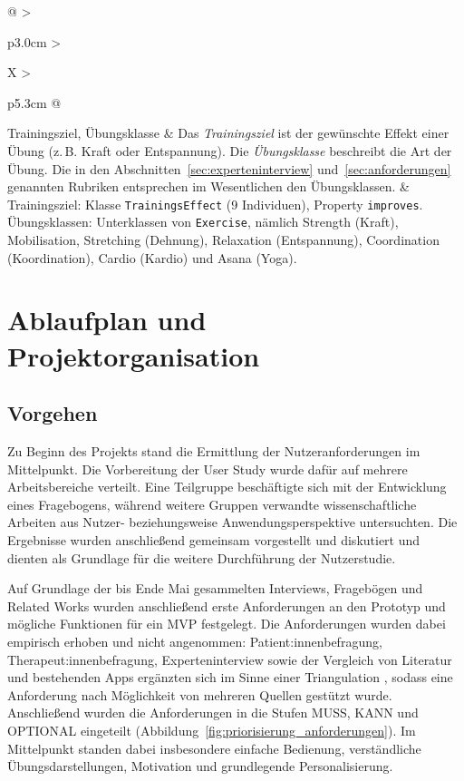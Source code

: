 {\begin{xltabular}{\textwidth}{@{} >{\raggedright\arraybackslash}p{3.0cm} >{\raggedright\arraybackslash}X >{\raggedright\arraybackslash}p{5.3cm} @{}}
    Trainingsziel, Übungsklasse & Das \emph{Trainingsziel} ist der gewünschte Effekt einer Übung (z.\,B. Kraft oder Entspannung). Die \emph{Übungsklasse} beschreibt die Art der Übung. Die in den Abschnitten~\ref{sec:experteninterview} und~\ref{sec:anforderungen} genannten Rubriken entsprechen im Wesentlichen den Übungsklassen. & Trainingsziel: Klasse \texttt{TrainingsEffect} (9 Individuen), Property \texttt{improves}. Übungsklassen: Unterklassen von \texttt{Exercise}, nämlich Strength (Kraft), Mobilisation, Stretching (Dehnung), Relaxation (Entspannung), Coordination (Koordination), Cardio (Kardio) und Asana (Yoga). \\
\end{xltabular}
}

\section{Ablaufplan und Projektorganisation}

\subsection{Vorgehen}

Zu Beginn des Projekts stand die Ermittlung der Nutzeranforderungen im Mittelpunkt. Die Vorbereitung der User Study wurde dafür auf mehrere Arbeitsbereiche verteilt. Eine Teilgruppe beschäftigte sich mit der Entwicklung eines Fragebogens, während weitere Gruppen verwandte wissenschaftliche Arbeiten aus Nutzer- beziehungsweise Anwendungsperspektive untersuchten. Die Ergebnisse wurden anschließend gemeinsam vorgestellt und diskutiert und dienten als Grundlage für die weitere Durchführung der Nutzerstudie.

Auf Grundlage der bis Ende Mai gesammelten Interviews, Fragebögen und Related Works wurden anschließend erste Anforderungen an den Prototyp und mögliche Funktionen für ein MVP festgelegt. Die Anforderungen wurden dabei empirisch erhoben und nicht angenommen: Patient:innenbefragung, Therapeut:innenbefragung, Experteninterview sowie der Vergleich von Literatur und bestehenden Apps ergänzten sich im Sinne einer Triangulation \autocite{flick2011triangulation,pohl2010requirements}, sodass eine Anforderung nach Möglichkeit von mehreren Quellen gestützt wurde. Anschließend wurden die Anforderungen in die Stufen MUSS, KANN und OPTIONAL eingeteilt (Abbildung~\ref{fig:priorisierung_anforderungen}). Im Mittelpunkt standen dabei insbesondere einfache Bedienung, verständliche Übungsdarstellungen, Motivation und grundlegende Personalisierung.

